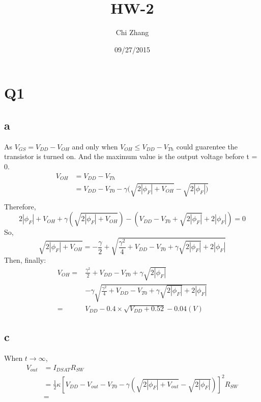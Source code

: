 \documentclass[a4paper,10pt]{article}
\title{HW-2}
\author{Chi Zhang}
\date{09/27/2015}
\begin{document}
\maketitle
\section*{Q1}
\subsection*{a}
As \begin{math}V_{GS} = V_{DD} - V_{OH}\end{math} and only when \begin{math}V_{OH} \leq V_{DD} - V_{Th}\end{math} could 
guarentee the transistor is turned on. And the maximum value is the output voltage before t = 0.
\begin{equation}
\begin{split}
 V_{OH} &= V_{DD} - V_{Th}\\
        &= V_{DD} - V_{T0} - \gamma(\sqrt{2|\phi_F| + V_{OH}} - \sqrt{2|\phi_F|)}\\
\end{split}
\end{equation}
Therefore, 
\begin{equation}
2|\phi_F| + V_{OH} + \gamma(\sqrt{2|\phi_F| + V_{OH}}) - (V_{DD} - V_{T0} + \sqrt{2|\phi_F|} + 2|\phi_F|) = 0
\end{equation}
So,
\begin{equation}
\sqrt{2|\phi_F| + V_{OH}} = -\frac{\gamma}{2} + \sqrt{\frac{\gamma ^2}{4} + V_{DD} - V_{T0} + \gamma\sqrt{2|\phi_F|}
+ 2|\phi_F|}
\end{equation}
Then, finally:
\begin{equation}
\begin{split}
V_{OH} =& \frac{\gamma ^2}{2} + V_{DD} - V_{T0} + \gamma\sqrt{2|\phi_F|} \\
                &-\gamma\sqrt{\frac{\gamma ^2}{4} + V_{DD} - V_{T0} + \gamma\sqrt{2|\phi_F|} + 2|\phi_F|}\\
              =&V_{DD} - 0.4\times\sqrt{V_{DD} + 0.52} - 0.04 (V)
\end{split}
\end{equation}
\subsection*{c}
When \begin{math}t\rightarrow\infty\end{math},
\begin{equation}
\begin{split}
V_{out} &= I_{DSAT}R_{SW}\\
&= \frac{1}{2}\kappa[V_{DD} - V_{out} - V_{T0} - \gamma(\sqrt{2|\phi_F| + V_{out} } - \sqrt{2|\phi_F|})] ^2 R_{SW}\\
&=
\end{split}
\end{equation}
\end{document}

